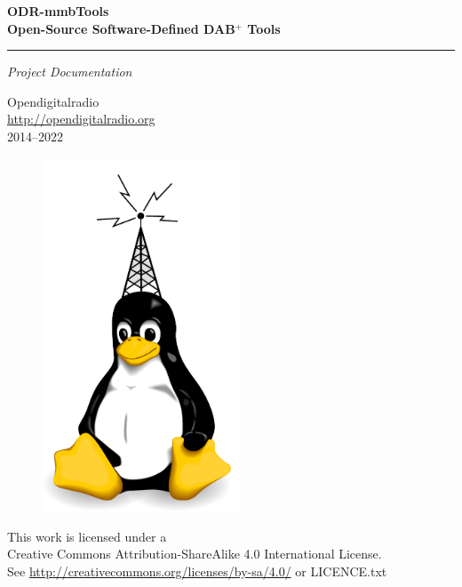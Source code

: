 \documentclass[a4paper,oneside,10pt]{article}
\newcommand{\dabplus}{DAB$^\mathrm{+}$\xspace}
\newcommand{\titleinfo}{ODR-mmbTools \\
Open-Source Software-Defined \dabplus Tools}
\begin{document}
 \begin{titlepage}
    \null\vfil
    \begin{flushleft}
      \huge \textbf{\titleinfo}
    \end{flushleft}
    \par
    \hrule height 4pt
    \par
    \begin{flushright}
      \large
      \textsl{Project Documentation} \par
    \end{flushright}
    \vspace{\fill}

    \begin{center}
        \Large
        Opendigitalradio\\\href{http://opendigitalradio.org}{http://opendigitalradio.org}\\2014--2022
    \end{center}
    \vspace{\fill}

    \begin{figure}[!h]
        \centering
        \parbox{2.2in}{\includegraphics[width=16em]{figures/dabtux.pdf}}
    \end{figure}

    \vspace*{1cm}
    \begin{center}
    This work is licensed under a \\
    Creative Commons Attribution-ShareAlike 4.0 International License.\\
    See \url{http://creativecommons.org/licenses/by-sa/4.0/} or LICENCE.txt
    \end{center}
 \end{titlepage}
\end{document}
